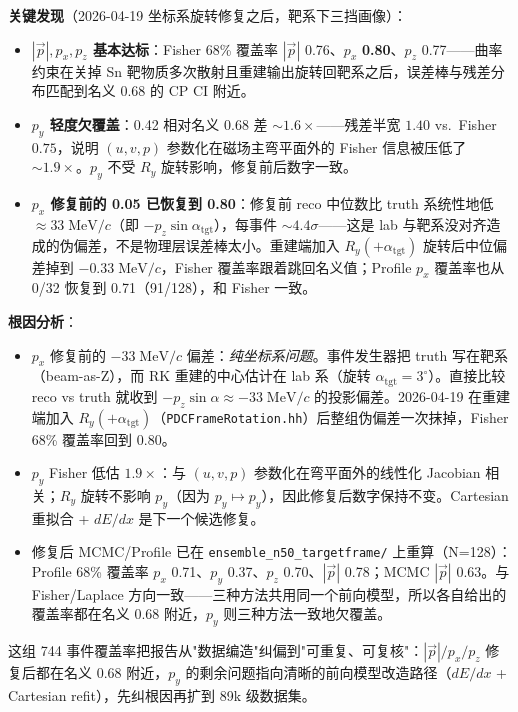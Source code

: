 \documentclass[a4paper, 11pt]{article}
\begin{document}
\textbf{关键发现}（2026-04-19 坐标系旋转修复之后，靶系下三挡画像）：
\begin{itemize}[nosep]
  \item \textbf{$|\vec p|, p_x, p_z$ 基本达标}：Fisher 68\% 覆盖率 $|\vec p|$ 0.76、$p_x$ \textbf{0.80}、$p_z$ 0.77——曲率约束在关掉 Sn 靶物质多次散射且重建输出旋转回靶系之后，误差棒与残差分布匹配到名义 0.68 的 CP CI 附近。
  \item \textbf{$p_y$ 轻度欠覆盖}：0.42 相对名义 0.68 差 $\sim\!1.6\times$——残差半宽 $1.40$ vs.\ Fisher $0.75$，说明 $(u,v,p)$ 参数化在磁场主弯平面外的 Fisher 信息被压低了 $\sim\!1.9\times$。$p_y$ 不受 $R_y$ 旋转影响，修复前后数字一致。
  \item \textbf{$p_x$ 修复前的 0.05 已恢复到 0.80}：修复前 reco 中位数比 truth 系统性地低 $\approx 33\;\mathrm{MeV}/c$（即 $-p_z \sin\alpha_\mathrm{tgt}$），每事件 $\sim 4.4\sigma$——这是 lab 与靶系没对齐造成的伪偏差，不是物理层误差棒太小。重建端加入 $R_y(+\alpha_\mathrm{tgt})$ 旋转后中位偏差掉到 $-0.33\;\mathrm{MeV}/c$，Fisher 覆盖率跟着跳回名义值；Profile $p_x$ 覆盖率也从 0/32 恢复到 0.71（91/128），和 Fisher 一致。
\end{itemize}

\textbf{根因分析}：
\begin{itemize}[nosep]
  \item $p_x$ 修复前的 $-33\;\mathrm{MeV}/c$ 偏差：\emph{纯坐标系问题}。事件发生器把 truth 写在靶系（beam-as-Z），而 RK 重建的中心估计在 lab 系（旋转 $\alpha_\mathrm{tgt}=3^\circ$）。直接比较 reco vs truth 就收到 $-p_z\sin\alpha \approx -33\;\mathrm{MeV}/c$ 的投影偏差。2026-04-19 在重建端加入 $R_y(+\alpha_\mathrm{tgt})$（\texttt{PDCFrameRotation.hh}）后整组伪偏差一次抹掉，Fisher 68\% 覆盖率回到 0.80。
  \item $p_y$ Fisher 低估 $1.9\times$：与 $(u,v,p)$ 参数化在弯平面外的线性化 Jacobian 相关；$R_y$ 旋转不影响 $p_y$（因为 $p_y \mapsto p_y$），因此修复后数字保持不变。Cartesian 重拟合 + $dE/dx$ 是下一个候选修复。
  \item 修复后 MCMC/Profile 已在 \texttt{ensemble\_n50\_targetframe/} 上重算（N=128）：Profile 68\% 覆盖率 $p_x$ 0.71、$p_y$ 0.37、$p_z$ 0.70、$|\vec p|$ 0.78；MCMC $|\vec p|$ 0.63。与 Fisher/Laplace 方向一致——三种方法共用同一个前向模型，所以各自给出的覆盖率都在名义 0.68 附近，$p_y$ 则三种方法一致地欠覆盖。
\end{itemize}

这组 744 事件覆盖率把报告从"数据编造"纠偏到"可重复、可复核"：$|\vec p|/p_x/p_z$ 修复后都在名义 0.68 附近，$p_y$ 的剩余问题指向清晰的前向模型改造路径（$dE/dx$ + Cartesian refit），先纠根因再扩到 89k 级数据集。
\end{document}
